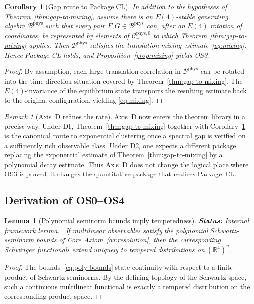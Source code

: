 \documentclass[12pt,a4paper]{article}
\theoremstyle{plain}
\newtheorem{lemma}[theorem]{Lemma}
\newtheorem{corollary}[theorem]{Corollary}
\theoremstyle{definition}
\theoremstyle{remark}
\newtheorem{remark}[theorem]{Remark}
\newcommand{\real}{\mathbb{R}}
\newcommand{\status}[1]{\textnormal{\textbf{Status:} #1.}\ }
\begin{document}
\begin{corollary}[Gap route to Package CL]\label{cor:gap-to-cl}
  In addition to the hypotheses of Theorem~\ref{thm:gap-to-mixing},
  assume there is an $E(4)$-stable generating algebra
  $\mathcal{B}^{\mathrm{phys}}$ such that every pair
  $F,G \in \mathcal{B}^{\mathrm{phys}}$ can, after an $E(4)$ rotation
  of coordinates, be represented by elements of
  $\mathcal{C}^{\mathrm{phys},0}_+$ to which
  Theorem~\ref{thm:gap-to-mixing} applies. Then
  $\mathcal{B}^{\mathrm{phys}}$ satisfies the translation-mixing
  estimate~\eqref{eq:mixing}. Hence Package CL holds, and
  Proposition~\ref{prop:mixing} yields OS3.
\end{corollary}
\begin{proof}
  By assumption, each large-translation correlation in
  $\mathcal{B}^{\mathrm{phys}}$ can be rotated into the time-direction
  situation covered by Theorem~\ref{thm:gap-to-mixing}. The
  $E(4)$-invariance of the equilibrium state transports the resulting
  estimate back to the original configuration, yielding
  \eqref{eq:mixing}.
\end{proof}

\begin{remark}[Axis~D refines the rate]
  Axis~D now enters the theorem library in a precise way. Under D1,
  Theorem~\ref{thm:gap-to-mixing} together with
  Corollary~\ref{cor:gap-to-cl} is the canonical route to
  exponential clustering once a spectral gap is verified on a
  sufficiently rich observable class. Under D2,
  one expects a different package replacing the exponential estimate
  of Theorem~\ref{thm:gap-to-mixing} by a polynomial decay estimate.
  Thus Axis~D does not change the logical place where OS3 is proved;
  it changes the quantitative package that realizes Package~CL.
\end{remark}


\subsection{Derivation of OS0--OS4}

\begin{lemma}[Polynomial seminorm bounds imply temperedness]
  \label{lem:seminorms-tempered}
  \status{Internal framework lemma}
  If multilinear observables satisfy the polynomial Schwartz-seminorm
  bounds of Core Axiom~\ref{ax:resolution}, then the corresponding
  Schwinger functionals extend uniquely to tempered distributions on
  \((\real^4)^n\).
\end{lemma}
\begin{proof}
  The bounds~\eqref{eq:poly-bounds} state continuity with respect to a
  finite product of Schwartz seminorms. By the defining topology of
  the Schwartz space, such a continuous multilinear functional is
  exactly a tempered distribution on the corresponding product space.
\end{proof}
\end{document}

